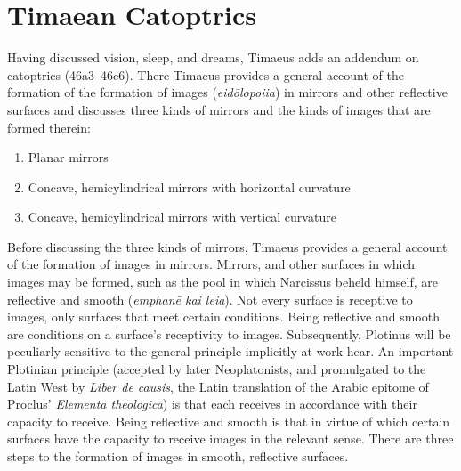 
\section{Timaean Catoptrics} %
\label{sec:timaen_catoptrics}

Having discussed vision, sleep, and dreams, Timaeus adds an addendum on catoptrics (46a3–46c6). There Timaeus provides a general account of the formation of the formation of images (\emph{eidōlopoiia}) in mirrors and other reflective surfaces and discusses three kinds of mirrors and the kinds of images that are formed therein:
\begin{enumerate}[(1)]
	\item Planar mirrors
	\item Concave, hemicylindrical mirrors with horizontal curvature
	\item Concave, hemicylindrical mirrors with vertical curvature
\end{enumerate}

Before discussing the three kinds of mirrors, Timaeus provides a general account of the formation of images in mirrors. Mirrors, and other surfaces in which images may be formed, such as the pool in which Narcissus beheld himself, are reflective and smooth (\emph{emphanē kai leia}). Not every surface is receptive to images, only surfaces that meet certain conditions. Being reflective and smooth are conditions on a surface's receptivity to images. Subsequently, Plotinus will be peculiarly sensitive to the general principle implicitly at work hear. An important Plotinian principle (accepted by later Neoplatonists, and promulgated to the Latin West by \emph{Liber de causis}, the Latin translation of the Arabic epitome of Proclus' \emph{Elementa theologica}) is that each receives in accordance with their capacity to receive. Being reflective and smooth is that in virtue of which certain surfaces have the capacity to receive images in the relevant sense. There are three steps to the formation of images in smooth, reflective surfaces. 


